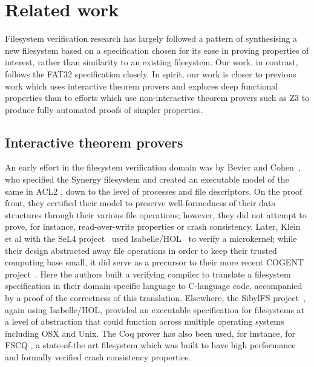 \documentclass[submission,copyright,creativecommons]{eptcs}
\begin{document}
\section{Related work}

Filesystem verification research has largely followed a pattern of
synthesising a new filesystem based on a specification chosen for its
ease in proving properties of interest, rather than similarity to an
existing filesystem. Our work, in contrast, follows the FAT32
specification closely. In spirit, our work is closer to previous work
which uses interactive theorem provers and explores deep functional
properties than to efforts which use non-interactive theorem provers
such as Z3 to produce fully automated proofs of simpler properties.

\subsection{Interactive theorem provers}
An early effort in the filesystem verification domain was by Bevier
and Cohen~\cite{bevier1996executable}, who specified the Synergy
filesystem and created an executable model of the same in ACL2
\cite{kaufmann2000}, down to the level of processes
and file descriptors. On the proof front, they certified their model
to preserve well-formedness of their data structures through their
various file operations; however, they did not attempt to prove, for
instance, read-over-write properties or crash consistency. Later,
Klein et al with the SeL4 project~\cite{klein2009sel4} used
Isabelle/HOL~\cite{nipkow2002isabelle} to verify a microkernel;
while their design abstracted away file operations in order to keep
their trusted computing base small, it did serve as a precursor to their
more recent COGENT project~\cite{amani2016cogent}. Here the authors
built a verifying compiler to translate a filesystem specification in
their domain-specific language to C-language code, accompanied by
a proof of the correctness of this translation. Elsewhere, the SibylFS
project~\cite{ridge2015sibylfs}, again using Isabelle/HOL, provided
an executable specification for filesystems at a level of abstraction
that could function across multiple operating systems including OSX
and Unix. The Coq prover \cite{bertot2013interactive} has also been
used, for instance, for FSCQ
\cite{DBLP:conf/usenix/ChenZCCKZ16}, a state-of-the art filesystem
which was built to have high performance and formally verified crash
consistency properties.
\end{document}
